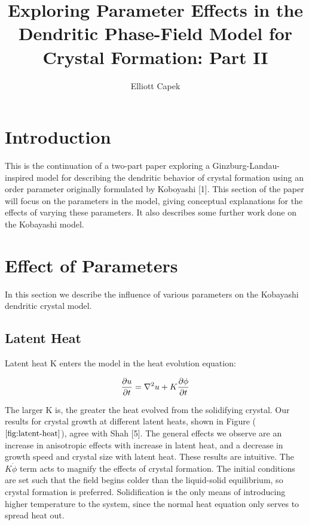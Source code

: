\documentclass[10pt]{article} %
\title{Exploring Parameter Effects in the Dendritic Phase-Field Model for Crystal Formation: Part II}
\author{Elliott Capek}
\begin{document}
\maketitle{}

\section{Introduction}
This is the continuation of a two-part paper exploring a Ginzburg-Landau-inspired model for describing the dendritic behavior of crystal formation using an order parameter originally formulated by Koboyashi [1]. This section of the paper will focus on the parameters in the model, giving conceptual explanations for the effects of varying these parameters. It also describes some further work done on the Kobayashi model.

\section{Effect of Parameters}
In this section we describe the influence of various parameters on the Kobayashi dendritic crystal model.

\subsection{Latent Heat}
Latent heat K enters the model in the heat evolution equation:

\begin{equation}
  \frac{\partial u}{\partial t} = \nabla^2u + K\frac{\partial\phi}{\partial t}\\
\end{equation}

The larger K is, the greater the heat evolved from the solidifying crystal. Our results for crystal growth at different latent heats, shown in Figure ($\ref{fig:latent-heat}$), agree with Shah [5]. The general effects we observe are an increase in anisotropic effects with increase in latent heat, and a decrease in growth speed and crystal size with latent heat. These results are intuitive. The $K\dot{\phi}$ term acts to magnify the effects of crystal formation. The initial conditions are set such that the field begins colder than the liquid-solid equilibrium, so crystal formation is preferred. Solidification is the only means of introducing higher temperature to the system, since the normal heat equation only serves to spread heat out. \\
\end{document}
